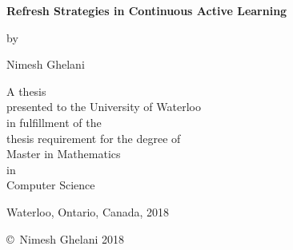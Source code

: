 \pagestyle{empty}

\begin{titlepage}
        \begin{center}
        \vspace*{1.0cm}

        \Huge
        {\bf Refresh Strategies in Continuous Active Learning }

        \vspace*{1.0cm}

        \normalsize
        by \\

        \vspace*{1.0cm}

        \Large
        Nimesh Ghelani \\

        \vspace*{3.0cm}

        \normalsize
        A thesis \\
        presented to the University of Waterloo \\ 
        in fulfillment of the \\
        thesis requirement for the degree of \\
        Master in Mathematics \\
        in \\
        Computer Science \\

        \vspace*{2.0cm}

        Waterloo, Ontario, Canada, 2018 \\

        \vspace*{1.0cm}

        \copyright\ Nimesh Ghelani 2018 \\
        \end{center}
\end{titlepage}

\pagestyle{plain}
\setcounter{page}{2}

